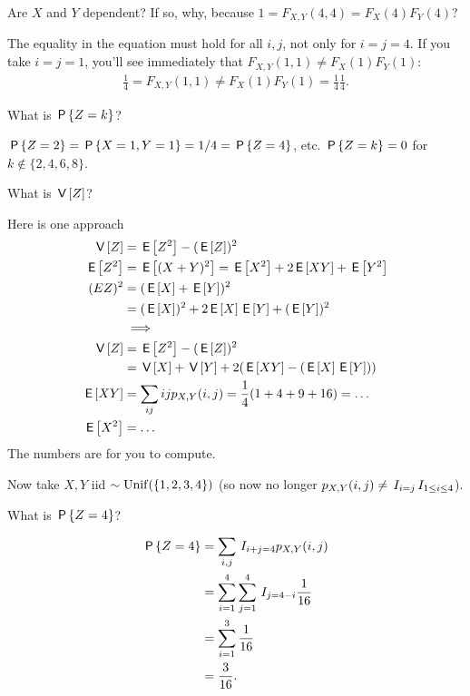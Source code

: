 \begin{exercise}
Are $X$ and $Y$ dependent?  If so, why, because $1=F_{X,Y}(4,4)= F_X(4)F_Y(4)$?
\begin{solution}
  The equality in the equation must hold for all $i,j$, not only for $i=j=4$.
  If you take $i=j=1$, you'll see immediately that $F_{X,Y}(1,1)\neq F_X(1)F_Y(1)$:
  \begin{align}
    \label{eq:23}
    \frac{1}{4} = F_{X,Y}(1,1) \neq F_{X}(1) F_Y(1) = \frac{1}{4}\frac{1}{4}.
  \end{align}
\end{solution}
\end{exercise}

\begin{exercise}
What is $\P{Z=k}$?
\begin{solution}
$\P{Z=2} = \P{X=1, Y=1} = 1/4 = \P{Z=4}$, etc.
$\P{Z=k} = 0$ for $k\not \in \{2, 4, 6, 8\}$.
\end{solution}
\end{exercise}


\begin{exercise}
What is $\V Z$?
\begin{solution}
Here is one approach
\begin{align}
\label{eq:3}
\V Z &= \E{Z^2} - (\E Z)^{2}\\
\E{Z^2} &= \E{(X+Y)^{2}} = \E{X^{2}} + 2\E{XY} + \E{Y^{2}} \\
(E{Z})^{2} &= (\E X + \E Y)^{2} \\
 &= (\E X)^2 + 2\E X \E Y + (\E Y)^{2} \\
&\implies \\
\V Z &= \E{Z^2} - (\E Z)^{2}\\
 &= \V X + \V Y + 2 (\E{XY} - (\E X \E Y))\\
\E{XY} &= \sum_{ij} ijp_{X,Y}(i,j) = \frac 1 4 (1 + 4 + 9 + 16) = \ldots \\
\E{X^{2}} &= \ldots
\end{align}
The numbers are for you to compute.
\end{solution}
\end{exercise}


Now take $X, Y$ iid $\sim\Unif{\{1,2,3,4\}}$ (so now no longer $p_{X,Y}(i,j) \neq \1{i=j}\1{1\leq i \leq 4}$).

\begin{exercise}
What is $\P{Z=4}$?
\begin{solution}
\begin{align}
\label{eq:2}
\P{Z=4}
&= \sum_{i, j} \1{i+j=4} p_{X,Y}(i,j) \\
&= \sum_{i=1}^4 \sum_{j=1}^{4} \1{j=4-i} \frac{1}{16} \\
&= \sum_{i=1}^3  \frac{1}{16} \\
&= \frac{3}{16}.
\end{align}
\end{solution}
\end{exercise}

